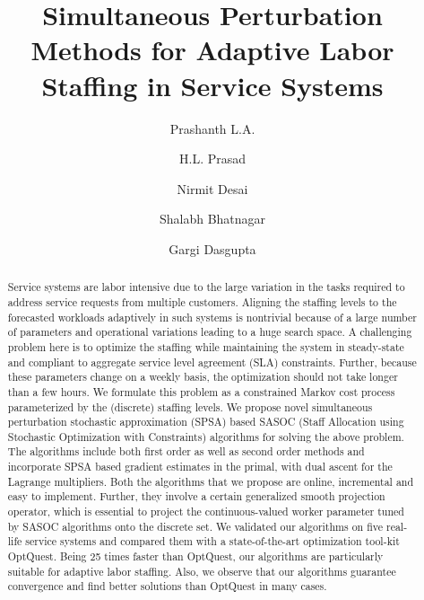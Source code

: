\documentclass[11pt,letterpaper,english]{article}
\begin{document}
\title{Simultaneous Perturbation Methods for Adaptive Labor Staffing in
Service Systems}
\author[$\dag$]{Prashanth L.A.}
\author[$\sharp$]{H.L. Prasad}
\author[$\$$]{Nirmit Desai}
\author[$\sharp$]{Shalabh Bhatnagar}
\author[$\$$]{Gargi Dasgupta}


\renewcommand\Authands{ and }

\date{}

\maketitle

\begin{abstract}
Service systems are labor intensive due to the large variation in the
tasks required to address service requests from multiple customers.
Aligning the staffing levels to the forecasted workloads adaptively in
such systems is nontrivial because of a large number of parameters and
operational variations leading to a huge search space.  A
challenging problem here is to optimize the staffing while maintaining the
system in steady-state and compliant to aggregate service level agreement (SLA) constraints.
Further, because these parameters change on a weekly basis, the
optimization should not take longer than a few hours.  We formulate
this problem as a constrained Markov cost process parameterized by the (discrete) staffing levels. We propose novel simultaneous perturbation stochastic approximation (SPSA) based SASOC (Staff Allocation using Stochastic Optimization with Constraints) algorithms for solving the above problem. The algorithms include both first order as well as second order methods and incorporate SPSA based gradient estimates in the primal, with dual ascent for the Lagrange multipliers. Both the algorithms that we propose are online, incremental and easy to implement. Further, they involve a certain generalized smooth projection operator, which is essential to project the continuous-valued worker parameter tuned by SASOC algorithms onto the discrete set. We validated our algorithms on five real-life service systems and compared them with a state-of-the-art optimization tool-kit OptQuest. Being 25 times faster than OptQuest, our algorithms are particularly suitable for adaptive labor staffing. Also, we observe that our 
algorithms guarantee convergence and find better solutions than OptQuest in many cases.
\end{abstract}
\end{document}
